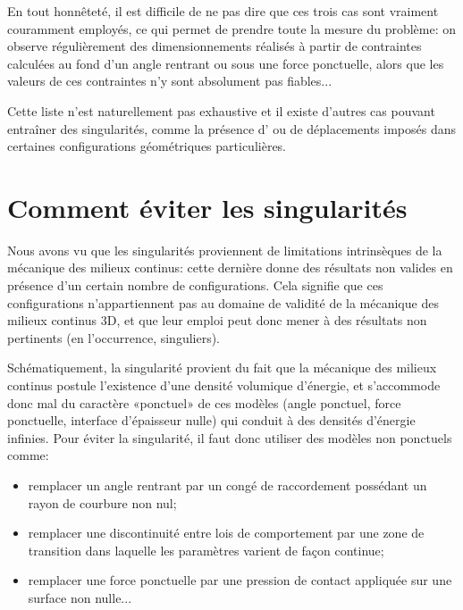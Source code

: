 \medskip
En tout honnêteté, il est difficile de ne pas dire que ces trois cas sont vraiment couramment employés, ce qui permet de prendre toute la mesure du problème: on observe régulièrement des dimensionnements réalisés à partir de contraintes calculées au fond d'un angle rentrant ou sous une force ponctuelle, alors que les valeurs de ces contraintes n'y sont absolument pas fiables...

Cette liste n'est naturellement pas exhaustive et il existe d'autres cas pouvant entraîner des singularités, comme la présence d' ou de déplacements imposés dans certaines configurations géométriques particulières. 


\medskip
\section{Comment éviter les singularités}

Nous avons vu que les singularités proviennent de limitations intrinsèques de la mécanique des milieux continus: cette dernière donne des résultats non valides en présence d'un certain nombre de configurations. Cela signifie que ces configurations n'appartiennent pas au domaine de validité de la mécanique des milieux continus 3D, et que leur emploi peut donc mener à des résultats non pertinents (en l'occurrence, singuliers).

\medskip
Schématiquement, la singularité provient du fait que la mécanique des milieux continus postule l'existence d'une densité volumique d'énergie, et s'accommode donc mal du caractère «ponctuel» de ces modèles (angle ponctuel, force ponctuelle, interface d'épaisseur nulle) qui conduit à des densités d'énergie infinies. Pour éviter la singularité, il faut donc utiliser des modèles non ponctuels comme:
\begin{itemize}
  \item remplacer un angle rentrant par un congé de raccordement possédant un rayon de courbure non nul;
  \item remplacer une discontinuité entre lois de comportement par une zone de transition dans laquelle les paramètres varient de façon continue;
  \item remplacer une force ponctuelle par une pression de contact appliquée sur une surface non nulle...
\end{itemize}

